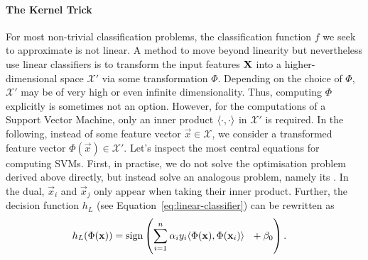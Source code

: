 \documentclass[
	fontsize=10pt, %
	twoside=true, %
	secnumdepth=1, %
  toc=indentunnumbered %
]{kaobook}
\begin{document}
\paragraph{The Kernel Trick} For most non-trivial classification problems, the
classification function $f$ we seek to approximate is not linear. A method to
move beyond linearity but nevertheless use linear classifiers is to transform
the input features $\mathbf{X}$ into a higher-dimensional space $\mathcal{X}'$ via
some transformation $\Phi$. Depending on the choice of $\Phi$, $\mathcal{X'}$
may be of very high or even infinite dimensionality. Thus, computing $\Phi$
explicitly is sometimes not an option. However, for the computations of a
Support Vector Machine, only an inner product $\langle \cdot, \cdot \rangle$ in
$\mathcal{X}'$ is required. In the following, instead of some feature vector
$\vec x \in \mathcal{X}$, we consider a transformed feature vector $\Phi(\vec x)
\in \mathcal{X} '$.
%
Let's inspect the most central equations for computing SVMs. First, in practise,
we do not solve the optimisation problem derived above directly, but instead
solve an analogous problem, namely its . In the dual, $\vec
x_i$ and $\vec x_j$ only appear when taking their inner product.
%
Further, the decision function $h_L$ (see Equation~\ref{eq:linear-classifier}) can be
rewritten as
\begin{align*}
  h_L(\Phi(\mathbf{x})) & = \text{sign}\left( \sum_{i=1}^n \alpha_i y_i \langle \Phi(\mathbf{x}), \Phi(\mathbf{x}_i) \rangle ~~ + \beta_0 \right).
\end{align*}
\end{document}

